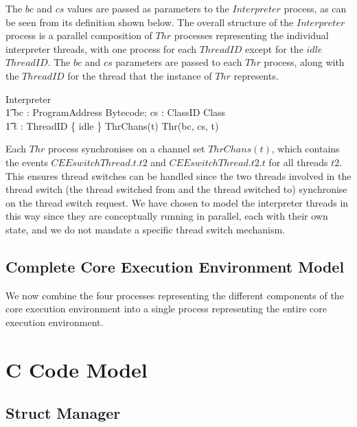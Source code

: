 The $bc$ and $cs$ values are passed as parameters to the $Interpreter$
process, as can be seen from its definition shown below.
The overall structure of the $Interpreter$ process is a parallel
composition of $Thr$ processes representing the individual interpreter
threads, with one process for each $ThreadID$ except for the $idle$
$ThreadID$.
The $bc$ and $cs$ parameters are passed to each $Thr$ process, along
with the $ThreadID$ for the thread that the instance of $Thr$
represents.
\begin{circus}
  \circprocess Interpreter \circdef \\
  \t1 bc : ProgramAddress \pfun Bytecode; cs : ClassID \pfun Class \circspot \\
  \t1 \Parallel t : ThreadID \setminus \{ idle \} \lpar ThrChans(t) \rpar \circspot Thr(bc, cs, t)
\end{circus}
Each $Thr$ process synchronises on a channel set $ThrChans(t)$, which
contains the events $CEEswitchThread.t.t2$ and $CEEswitchThread.t2.t$
for all threads $t2$.
This ensures thread switches can be handled since the two threads
involved in the thread switch (the thread switched from and the thread
switched to) synchronise on the thread switch request.
We have chosen to model the interpreter threads in this way since they
are conceptually running in parallel, each with their own state, and
we do not mandate a specific thread switch mechanism.

\subsection{Complete Core Execution Environment Model}
\label{complete-cee-subsection}

We now combine the four \Circus{} processes representing the different
components of the core execution environment into a single \Circus{}
process representing the entire core execution environment.



\section{C Code Model}
\label{cee-c-code-section}

\subsection{Struct Manager}
\label{cee-struct-manager-subsection}

